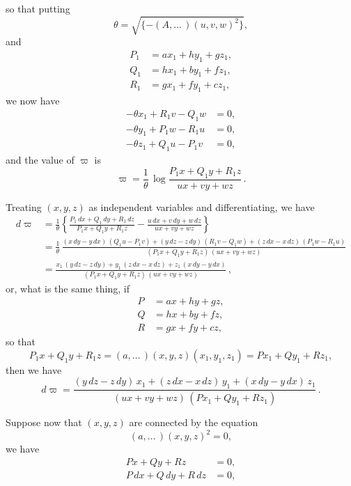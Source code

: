 \documentclass[11pt,a4paper]{article}
\begin{document}
\vspace{12pt}

\noindent
so that putting
\[
\theta = \sqrt{\{- (A, \ldots \,)(u, v, w)^{2}\}},
\]
and
\begin{align*}
P_{1} &= ax_{1} + hy_{1} + gz_{1},\\
Q_{1} &= hx_{1} + by_{1} + fz_{1},\\
R_{1} &= gx_{1} + fy_{1} + cz_{1},
\end{align*}
we now have
\begin{align*}
-\theta x_{1} + R_{1}v - Q_{1}w &= 0,\\
-\theta y_{1} + P_{1}w - R_{1}u &= 0,\\
-\theta z_{1} + Q_{1}u - P_{1}v &= 0,
\end{align*}
and the value of $\varpi$ is
\[
\varpi = \frac{1}{\theta}\,
\log \frac{P_{1}x + Q_{1}y + R_{1}z}{ux + vy + wz}\,.
\]

Treating $(x, y, z)$ as independent variables and differentiating, we have
\begin{align*}
d\varpi &= \frac{1}{\theta}\left\{
\frac{P_{1}\,dx + Q_{1}\,dy + R_{1}\,dz}{P_{1}x + Q_{1}y + R_{1}z}
- \frac{u\,dx + v\,dy + w\,dz}{ux + vy + wz}
\right\}\\
&= \frac{1}{\theta}\,
\frac{(x\,dy - y\,dx)\,(Q_{1}u - P_{1}v) + (y\,dz - z\,dy)\,(R_{1}v - Q_{1}w) + (z\,dx - x\,dz)\,(P_{1}w - R_{1}u)}
{(P_{1}x + Q_{1}y + R_{1}z)\,(ux + vy + wz)}\\
&= \frac{x_{1}\,(y\,dz - z\,dy) + y_{1}\,(z\,dx - x\,dz) + z_{1}\,(x\,dy - y\,dx)}
{(P_{1}x + Q_{1}y + R_{1}z)\,(ux + vy + wz)}\,,
\end{align*}
or, what is the same thing, if
\begin{align*}
P &= ax + hy + gz,\\
Q &= hx + by + fz,\\
R &= gx + fy + cz,
\end{align*}
so that
\[
P_{1}x + Q_{1}y + R_{1}z = (a, \ldots \,)(x, y, z)(x_{1}, y_{1}, z_{1}) = Px_{1} + Qy_{1} + Rz_{1},
\]
then we have
\[
d\varpi = \frac{(y\,dz - z\,dy)\,x_{1} + (z\,dx - x\,dz)\,y_{1} + (x\,dy - y\,dx)\,z_{1}}
{(ux + vy + wz)\,(Px_{1} + Qy_{1} + Rz_{1})}\,.
\]

Suppose now that $(x, y, z)$ are connected by the equation
\[
(a, \ldots \,)(x, y, z)^{2} = 0,
\]
we have
\begin{align*}
Px + Qy + Rz &= 0,\\
P\,dx + Q\,dy + R\,dz &= 0,
\end{align*}
\end{document}
